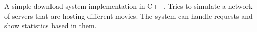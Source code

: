 A simple download system implementation in C++. Tries to simulate a network of servers that are hosting different movies. The system can handle requests and show statistics based in them. 